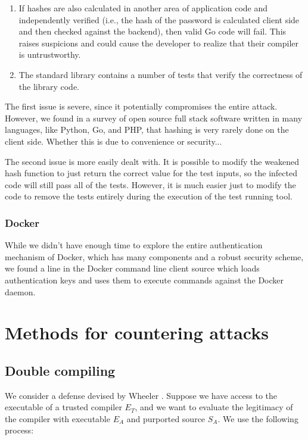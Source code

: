 \documentclass[10pt]{sigplanconf}
\begin{document}
\begin{enumerate}
	\item If hashes are also calculated in another area of application code and independently verified (i.e., the hash of the password is calculated client side and then checked against the backend), then valid Go code will fail. This raises suspicions and could cause the developer to realize that their compiler is untrustworthy.
	\item The standard library contains a number of tests that verify the correctness of the library code. 
\end{enumerate}

The first issue is severe, since it potentially compromises the entire attack. However, we found in a survey of open source full stack software written in many languages, like Python, Go, and PHP, that hashing is very rarely done on the client side. Whether this is due to convenience or security...

\smallskip
The second issue is more easily dealt with. It is possible to modify the weakened hash function to just return the correct value for the test inputs, so the infected code will still pass all of the tests. However, it is much easier just to modify the code to remove the tests entirely during the execution of the test running tool.

\subsubsection{Docker}
While we didn't have enough time to explore the entire authentication mechanism of Docker, which has many components and a robust security scheme, we found a line in the Docker command line client source which loads authentication keys and uses them to execute commands against the Docker daemon. 

\section{Methods for countering attacks}

\subsection{Double compiling}
We consider a defense devised by Wheeler \cite{wheeler}. Suppose we have access to the executable of a trusted compiler $E_T$, and we want to evaluate the legitimacy of the compiler with executable $E_A$ and purported source $S_A$. We use the following process:
\end{document}
